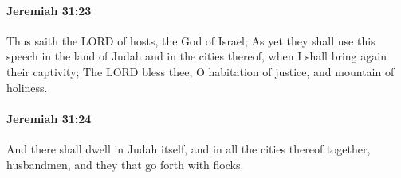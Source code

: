		\paragraph{Jeremiah 31:23} %
			\label{JEREMIAH-31-23}

			Thus saith the LORD of hosts, the God of Israel; As yet they shall use this speech in the land of Judah and in the cities thereof, when I shall bring again their captivity; The LORD bless thee, O habitation of justice, and mountain of holiness.


		\paragraph{Jeremiah 31:24} %
			\label{JEREMIAH-31-24}

			And there shall dwell in Judah itself, and in all the cities thereof together, husbandmen, and they that go forth with flocks.

